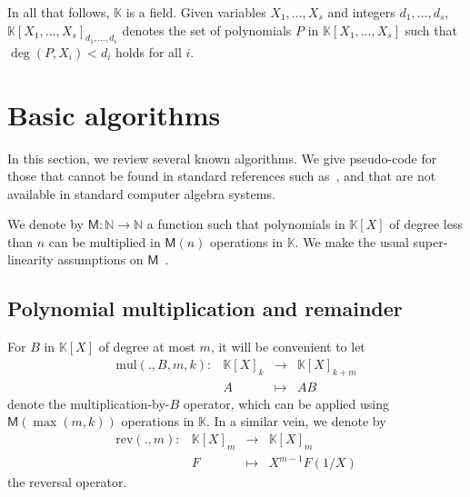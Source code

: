 \documentclass[12pt]{article}
\def\M {\ensuremath{\mathsf{M}}}
\def\N {\ensuremath{\mathbb{N}}}
\def\K {\ensuremath{\mathbb{K}}}
\def\mul {\ensuremath{\mathrm{mul}}}
\def\rev {\ensuremath{\mathrm{rev}}}
\begin{document}

In all that follows, $\K$ is a field.  Given variables $X_1,\dots,X_s$
and integers $d_1,\dots,d_s$, $\K[X_1,\dots,X_s]_{d_1,\dots,d_s}$
denotes the set of  polynomials $P$ in $\K[X_1,\dots,X_s]$ such
that $\deg(P,X_i) < d_i$ holds for all $i$.


\section{Basic algorithms}

In this section, we review several known algorithms. We give
pseudo-code for those that cannot be found in standard references such
as~\cite{vzGG}, and that are not available in standard computer
algebra systems.

We denote by $\M:\N \to \N$ a function such that polynomials in
$\K[X]$ of degree less than $n$ can be multiplied in $\M(n)$
operations in $\K$. We make the usual super-linearity assumptions on
$\M$~\cite[Chapter~8]{vzGG}.


\subsection{Polynomial multiplication and remainder}

For $B$ in $\K[X]$ of degree at most $m$, it will be convenient to let
$$
\begin{array}{cccc}
\mul(.,B,m,k): &\K[X]_k& \to &\K[X]_{k+m}\\
& A & \mapsto & AB
\end{array}$$ 
denote the multiplication-by-$B$ operator, which can be applied using
$\M(\max(m,k))$ operations in $\K$. In a similar vein, we denote by
$$
\begin{array}{cccc}
\rev(.,m): &\K[X]_m &\to& \K[X]_m  \\
& F & \mapsto & X^{m-1} F(1/X)
\end{array}$$ the reversal operator. 
\end{document}
